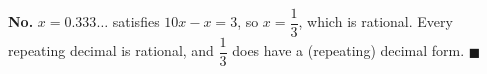 \textbf{No.} $x=0.333\ldots$ satisfies $10x-x=3$, so $x=\dfrac13$, which is rational. Every repeating decimal is rational, and $\dfrac13$ does have a (repeating) decimal form. $\blacksquare$
